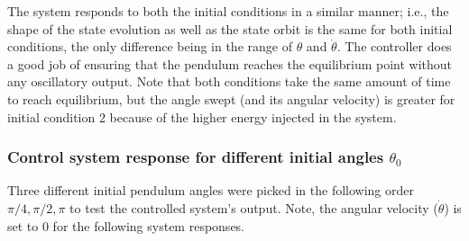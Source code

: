 \documentclass[10pt]{article}
\begin{document}
The system responds to both the initial conditions in a similar manner; i.e., the shape of the state evolution as well as the state orbit is the same for both initial conditions, the only difference being in the range of $\theta$ and $\dot{\theta}$. The controller does a good job of ensuring that the pendulum reaches the equilibrium point without any oscillatory output. Note that both conditions take the same amount of time to reach equilibrium, but the angle swept (and its angular velocity) is greater for initial condition 2 because of the higher energy injected in the system. 

\subsubsection{Control system response for different initial angles $\theta_0$}
Three different initial pendulum angles were picked in the following order $\pi/4, \pi/2, \pi$ to test the controlled system's output. Note, the angular velocity ($\dot{\theta}$) is set to 0 for the following system responses.
\end{document}
